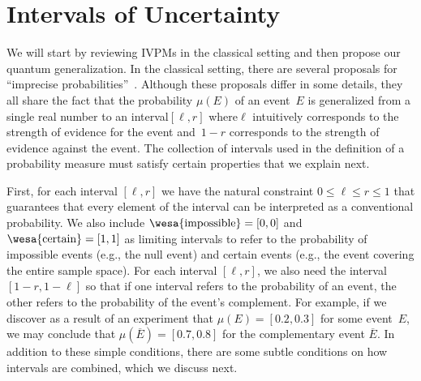 \documentclass[english,reprint, aps, prl,superscriptaddress, showpacs,
showkeys, longbibliography, amsmath, amssymb]{revtex4-1}
\theoremstyle{plain}
\theoremstyle{definition}
\newcommand{\imposs}{{\text{\wesa{impossible}}}}
\newcommand{\necess}{{\text{\wesa{certain}}}}
\newcommand{\nb}{\nolinebreak[1] }
\begin{document}
\section{Intervals of Uncertainty}
  \label{sec:Interval-Uncertainty}
We will start by reviewing IVPMs in the classical setting and then
propose our quantum generalization. In the classical setting, there
are several proposals for ``imprecise
probabilities''~\citep{Dempster1967,Shafer1976,GilboaSchmeidler1994,Marinacci1999,Weichselberger2000,JamisonLodwick2004,HuberRonchetti2009,Grabisch2016}.
Although these proposals differ in some details, they all share the
fact that the probability $\mu(E)$ of an event~$E$ is generalized from
a single real number to an interval\nb$[\ell,r]$
where\nb$\ell$ intuitively corresponds to the strength of evidence for
the event and~$1-r$ corresponds to the strength of evidence against the
event. The collection of intervals used in the definition of a
probability measure must satisfy certain properties that we explain
next.

First, for each interval $[\ell,r]$ we have the natural constraint
$0 \leq \ell \leq r \leq 1$ that guarantees that every element of the
interval can be interpreted as a conventional probability. We also
include $\imposs=[0,0]$ and $\necess=[1,1]$ as limiting intervals to
refer to the probability of impossible events (e.g., the null event)
and certain events (e.g., the event covering the entire sample space).
For each interval $[\ell,r]$, we also need the interval
$[1-r,1-\ell]$ so that if one interval refers to the probability of an
event, the other refers to the probability of the event's complement.
For example, if we discover as a result of an experiment that
$\mu(E) = [0.2,0.3]$ for some event~$E$, we may conclude that
$\mu(\overline{E}) = [0.7,0.8]$ for the complementary event
$\overline{E}$. In addition to these simple conditions, there are some
subtle conditions on how intervals are combined, which we discuss
next.
\end{document}
